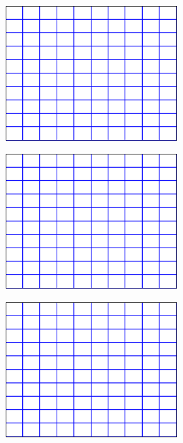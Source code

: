 \documentclass[11pt]{article}
\numberwithin{equation}{section}    %
\begin{document}
\vspace{5in}
\pagestyle{empty}
\begin{figure}[h!]
\centering
\includegraphics[width=3in]{grid1}
\end{figure}

\newpage

\vspace{5in}
\pagestyle{empty}
\begin{figure}[h!]
\centering
\includegraphics[width=3in]{grid1}
\end{figure}


\newpage

\vspace{5in}
\pagestyle{empty}
\begin{figure}[h!]
\centering
\includegraphics[width=3in]{grid1}
\end{figure}
\end{document}
